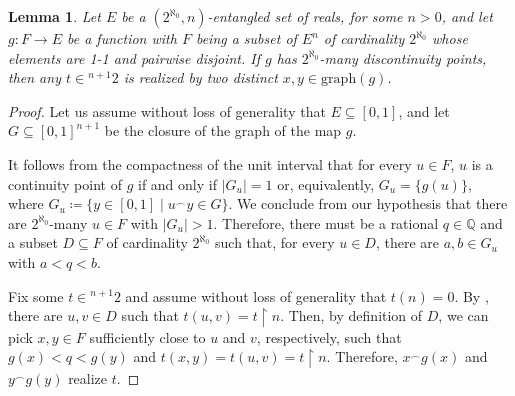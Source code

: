 \documentclass[12pt]{amsart}
\newtheorem{lemma}[theorem]{Lemma}
\theoremstyle{definition}
\theoremstyle{remark}
\begin{document}
\begin{lemma}\label{lemma:finalarg}
Let $E$ be a $(2^{\aleph_0}, n)$-entangled set of reals, for some $n > 0$, and let $g:F \rightarrow E$ be a function with $F$ being a subset of $E^n$ of cardinality $2^{\aleph_0}$ whose elements are 1-1 and pairwise disjoint. If $g$ has $2^{\aleph_0}$-many discontinuity points, then any $t \in {}^{n+1}2$ is realized by two distinct $x,y \in \mathrm{graph}(g)$.
\end{lemma}
\begin{proof}
Let us assume without loss of generality that $E\subseteq [0,1]$, and let $G \subseteq [0,1]^{n+1}$ be the closure of the graph of the map $g$.

It follows from the compactness of the unit interval that for every $u \in F$, $u$ is a continuity point of $g$ if and only if $|G_u| = 1$ or, equivalently, $G_u = \{g(u)\}$, where $G_u \coloneqq \{y \in [0,1] \mid u^\smallfrown y \in G\}$. We conclude from our hypothesis that there are $2^{\aleph_0}$-many $u \in F$ with $|G_u| > 1$. Therefore, there must be a rational $q \in \mathbb{Q}$ and a subset $D\subseteq F$ of cardinality $2^{\aleph_0}$ such that, for every $u \in D$, there are $a,b \in G_u$ with $a < q < b$. 

Fix some $t \in {}^{n+1} 2$ and assume without loss of generality that $t(n) = 0$. By , there are $u,v \in D$ such that $t(u, v) = t \upharpoonright n$. Then, by definition of $D$, we can pick $x,y \in F$ sufficiently close to $u$ and $v$, respectively, such that $g(x) < q < g(y)$ and $t(x, y) = t(u, v) = t \upharpoonright n$. Therefore, $x^\smallfrown g(x)$ and $y^\smallfrown g(y)$ realize $t$.
\end{proof}
\end{document}
